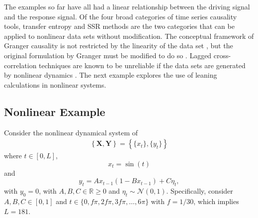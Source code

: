 \documentclass[twocolumn,aps,pre,groupedaddress]{revtex4-1}
\begin{document}
The examples so far have all had a linear relationship between the driving signal and the response signal.  Of the four broad categories of time series causality tools, transfer entropy \cite{kaiser2002} and SSR methods \cite{Sugihara2012} are the two categories that can be applied to nonlinear data sets without modification.  The conceptual framework of Granger causality is not restricted by the linearity of the data set \cite{Granger1980}, but the original formulation by Granger must be modified to do so \cite{Sun2008}.  Lagged cross-correlation techniques are known to be unreliable if the data sets are generated by nonlinear dynamics \cite{Rogosa1980}.  The next example explores the use of leaning calculations in nonlinear systems.

\subsection{Nonlinear Example}
\label{sec:nonli}
Consider the nonlinear dynamical system of
\begin{eqnarray}
\label{eqn:nonlinearEX}
\left\{\mathbf{X},\mathbf{Y}\right\} = \left\{\{x_t\},\{y_t\}\right\}
\end{eqnarray}
where $t\in[0,L]$,
\begin{equation*}
x_t = \sin(t)
\end{equation*}
and
\begin{equation*}
y_t = Ax_{t-1}\left(1-Bx_{t-1}\right)+C\eta_t,
\end{equation*}
with $y_0 = 0$, with $A,B,C\in\mathbb{R}\ge 0$ and $\eta_t\sim\mathcal{N}\left(0,1\right)$.  Specifically, consider $A,B,C\in[0,1]$ and $t\in\{0,f\pi,2f\pi,3f\pi,\ldots,6\pi\}$ with $f=1/30$, which implies $L=181$.
\end{document}
